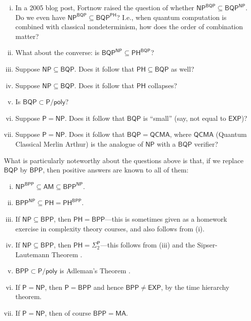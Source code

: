 \documentclass[11pt]{article}%
\begin{document}
\begin{enumerate}[(i)]
\item In a 2005 blog post, Fortnow \cite{For05} raised the question of whether $\mathsf{NP^{BQP}} \subseteq \mathsf{BQP^{NP}}$. Do we even have $\mathsf{NP^{BQP}} \subseteq \mathsf{BQP^{PH}}$? I.e., when quantum computation is combined with classical nondeterminism, how does the order of combination matter?
\item What about the converse: is $\mathsf{BQP^{NP}} \subseteq \mathsf{PH^{BQP}}$? 

\item Suppose $\mathsf{NP} \subseteq \mathsf{BQP}$.  Does it follow that $\mathsf{PH} \subseteq \mathsf{BQP}$ as well?

\item Suppose $\mathsf{NP} \subseteq \mathsf{BQP}$.  Does it follow that $\mathsf{PH}$ collapses?

\item Is $\mathsf{BQP} \subset \mathsf{P/poly}$?

\item Suppose $\mathsf{P} = \mathsf{NP}$.  Does it follow that $\mathsf{BQP}$ is ``small'' (say, not equal to $\mathsf{EXP}$)?

\item Suppose $\mathsf{P} = \mathsf{NP}$.  Does it follow that $\mathsf{BQP} = \mathsf{QCMA}$, where $\mathsf{QCMA}$ (Quantum Classical Merlin Arthur) is the analogue of $\mathsf{NP}$ with a $\mathsf{BQP}$ verifier?
\end{enumerate}

What is particularly noteworthy about the questions above is that, if we replace $\mathsf{BQP}$ by $\mathsf{BPP}$, then positive answers are known to all of them:

\begin{enumerate}[(i)]
\item $\mathsf{NP}^\mathsf{BPP} \subseteq \mathsf{AM} \subseteq \mathsf{BPP}^\mathsf{NP}$.
\item $\mathsf{BPP}^\mathsf{NP} \subseteq \mathsf{PH} = \mathsf{PH}^\mathsf{BPP}$.
\item If $\mathsf{NP} \subseteq \mathsf{BPP}$, then $\mathsf{PH} = \mathsf{BPP}$---this is sometimes given as a homework exercise in complexity theory courses, and also follows from (i).

\item If $\mathsf{NP} \subseteq \mathsf{BPP}$, then $\mathsf{PH} = \mathsf{\Sigma}_2^\mathsf{P}$---this follows from (iii) and the Sipser-Lautemann Theorem \cite{Sip83,Lau83}.

\item $\mathsf{BPP} \subset \mathsf{P/poly}$ is Adleman's Theorem \cite{Adl78}.

\item If $\mathsf{P}=\mathsf{NP}$, then $\mathsf{P}=\mathsf{BPP}$ and hence $\mathsf{BPP}\neq\mathsf{EXP}$, by the time hierarchy theorem.

\item If $\mathsf{P}=\mathsf{NP}$, then of course $\mathsf{BPP} = \mathsf{MA}$.
\end{enumerate}
\end{document}
